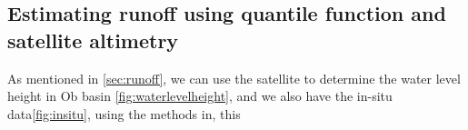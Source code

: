 \subsection{Estimating runoff using quantile function and satellite altimetry}
 As mentioned in \ref{sec:runoff}, we can use the satellite to determine the water level height in Ob basin \ref{fig:waterlevelheight}, and we also have the in-situ data\ref{fig:insitu}, using the methods in, this 
